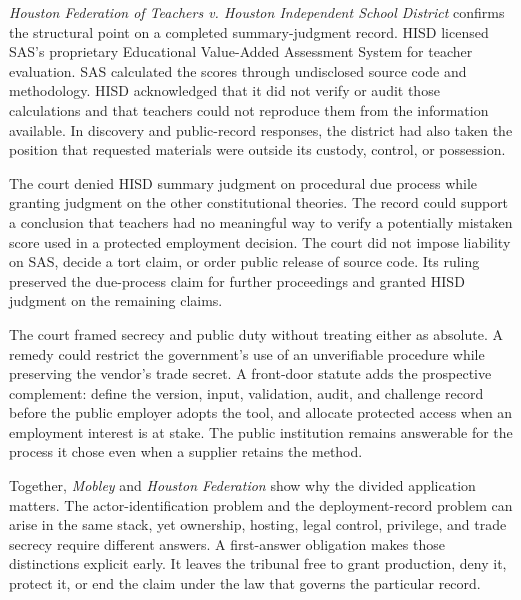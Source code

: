 \emph{Houston Federation of Teachers v. Houston Independent School District} confirms the structural point on a completed summary-judgment record. HISD licensed SAS's proprietary Educational Value-Added Assessment System for teacher evaluation. SAS calculated the scores through undisclosed source code and methodology. HISD acknowledged that it did not verify or audit those calculations and that teachers could not reproduce them from the information available. In discovery and public-record responses, the district had also taken the position that requested materials were outside its custody, control, or possession.

The court denied HISD summary judgment on procedural due process while granting judgment on the other constitutional theories. The record could support a conclusion that teachers had no meaningful way to verify a potentially mistaken score used in a protected employment decision. The court did not impose liability on SAS, decide a tort claim, or order public release of source code. Its ruling preserved the due-process claim for further proceedings and granted HISD judgment on the remaining claims.

The court framed secrecy and public duty without treating either as absolute. A remedy could restrict the government's use of an unverifiable procedure while preserving the vendor's trade secret. A front-door statute adds the prospective complement: define the version, input, validation, audit, and challenge record before the public employer adopts the tool, and allocate protected access when an employment interest is at stake. The public institution remains answerable for the process it chose even when a supplier retains the method.

Together, \emph{Mobley} and \emph{Houston Federation} show why the divided application matters. The actor-identification problem and the deployment-record problem can arise in the same stack, yet ownership, hosting, legal control, privilege, and trade secrecy require different answers. A first-answer obligation makes those distinctions explicit early. It leaves the tribunal free to grant production, deny it, protect it, or end the claim under the law that governs the particular record.
